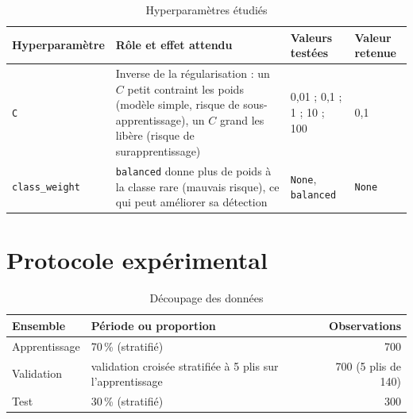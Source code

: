 \documentclass[11pt,a4paper]{article}
\begin{document}
\begin{table}[htbp]
  \centering
  \caption{Hyperparamètres étudiés}
  \label{tab:hyper}
  \small
  \begin{tabular}{@{}l P{6.4cm} l l@{}}
    \toprule
    Hyperparamètre & Rôle et effet attendu & Valeurs testées & Valeur retenue \\
    \midrule
    \texttt{C} & Inverse de la régularisation : un $C$ petit contraint les poids (modèle simple, risque de sous-apprentissage), un $C$ grand les libère (risque de surapprentissage) & 0,01 ; 0,1 ; 1 ; 10 ; 100 & 0,1 \\
    \texttt{class\_weight} & \texttt{balanced} donne plus de poids à la classe rare (mauvais risque), ce qui peut améliorer sa détection & \texttt{None}, \texttt{balanced} & \texttt{None} \\
    \bottomrule
  \end{tabular}
\end{table}

\section{Protocole expérimental}
\label{sec:protocole}
\begin{table}[htbp]
  \centering
  \caption{Découpage des données}
  \label{tab:decoupage}
  \small
  \begin{tabular}{@{}l l r@{}}
    \toprule
    Ensemble & Période ou proportion & Observations \\
    \midrule
    Apprentissage & 70\,\% (stratifié) & 700 \\
    Validation & validation croisée stratifiée à 5 plis sur l'apprentissage & 700 (5 plis de 140) \\
    Test & 30\,\% (stratifié) & 300 \\
    \bottomrule
  \end{tabular}
\end{table}
\end{document}
